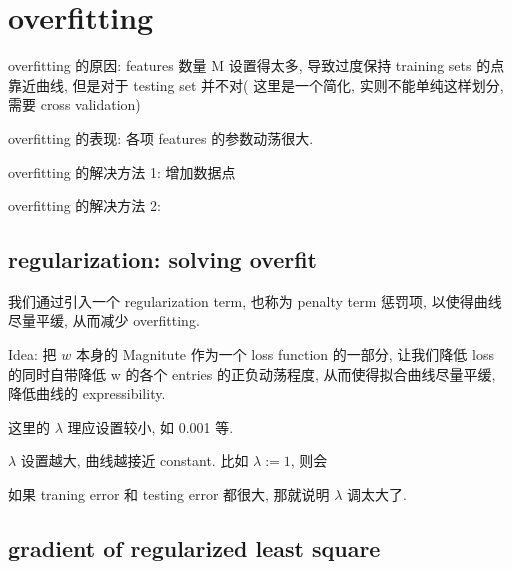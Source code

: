 \documentclass[lang=cn,11pt]{elegantbook}
\begin{document}
\hypertarget{overfitting}{%
\section{overfitting}\label{overfitting}}



overfitting 的原因: features 数量 M 设置得太多, 导致过度保持 training
sets 的点靠近曲线, 但是对于 testing set 并不对( 这里是一个简化,
实则不能单纯这样划分, 需要 cross validation)


overfitting 的表现: 各项 features 的参数动荡很大.


overfitting 的解决方法 1: 增加数据点


overfitting 的解决方法 2:

\hypertarget{regularization-solving-overfit}{%
\subsection{regularization: solving
overfit}\label{regularization-solving-overfit}}

我们通过引入一个 regularization term, 也称为 penalty term 惩罚项,
以使得曲线尽量平缓, 从而减少 overfitting.

Idea: 把 \(w\) 本身的 Magnitute 作为一个 loss function 的一部分,
让我们降低 loss 的同时自带降低 w 的各个 entries 的正负动荡程度,
从而使得拟合曲线尽量平缓, 降低曲线的 expressibility.


这里的 \(\lambda\) 理应设置较小, 如 0.001 等.

\(\lambda\) 设置越大, 曲线越接近 constant. 比如 \(\lambda := 1\), 则会


如果 traning error 和 testing error 都很大, 那就说明 \(\lambda\)
调太大了.

\hypertarget{gradient-of-regularized-least-square}{%
\subsection{gradient of regularized least
square}\label{gradient-of-regularized-least-square}}
\end{document}
